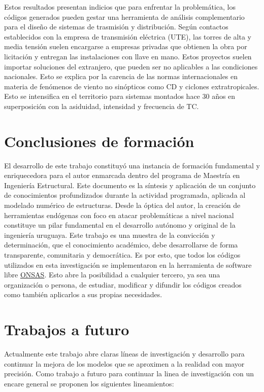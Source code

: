 Estos resultados presentan indicios que para enfrentar la problemática, los códigos generados pueden gestar una herramienta de análisis complementario para el diseño de sistemas de trasmisión y distribución. Según contactos establecidos con la empresa de transmisión eléctrica (UTE), las torres de alta y media tensión suelen encargarse a empresas privadas que obtienen la obra por licitación y entregan las instalaciones con llave en mano. Estos proyectos suelen importar soluciones del extranjero, que pueden ser no aplicables a las condiciones nacionales. Esto se explica por la carencia de las normas internacionales en materia de fenómenos de viento no sinópticos como CD y ciclones extratropicales. Esto se intensifica en el territorio para sistemas montados hace 30 años en superposición con la asiduidad, intensidad y frecuencia de TC. 

\section{Conclusiones de formación}
El desarrollo de este trabajo constituyó una instancia de formación fundamental y enriquecedora para el autor enmarcada dentro del programa de Maestría en Ingeniería Estructural. Este documento es la síntesis y aplicación de un conjunto de conocimientos profundizados durante la actividad programada, aplicada al modelado numérico de estructuras. Desde la óptica del autor, la creación de herramientas endógenas con foco en atacar problemáticas a nivel nacional constituye un pilar fundamental en el desarrollo autónomo y original de la ingeniería uruguaya. Este trabajo es una muestra de la convicción y determinación, que el conocimiento académico, debe desarrollarse de forma transparente, comunitaria y democrática. Es por esto, que todos los códigos utilizados en esta investigación se implementaron en la herramienta de software libre \href{https://github.com/ONSAS/ONSAS/}{ONSAS}. Esto abre la posibilidad a cualquier tercero, ya sea una organización o persona, de estudiar, modificar y difundir los códigos creados como también aplicarlos a sus propias necesidades. 

\section{Trabajos a futuro}

Actualmente este trabajo abre claras líneas de investigación y desarrollo para continuar la mejora de los modelos que se aproximen a la realidad con mayor precisión. Como trabajo a futuro para continuar la linea de investigación con un encare general se proponen los siguientes lineamientos:

